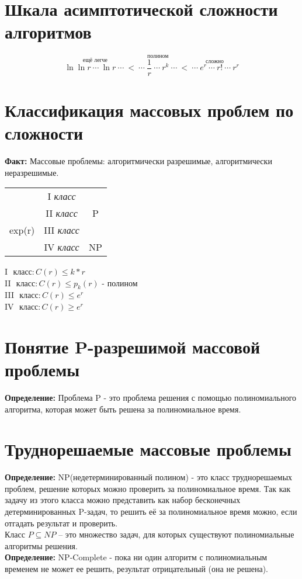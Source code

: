 \documentclass[../main.tex]{subfiles}
\begin{document}
%
\section{Шкала асимптотической сложности алгоритмов}
\[\stackrel{\textit{ещё легче}}{\ln{\ln{r}} \ \cdots \ \ln{r}  \ \cdots \ }  < \stackrel{\textit{полином}}{ \ \cdots \ \frac{1}{r}  \ \cdots \ r^k  \ \cdots \ } < \stackrel{\textit{сложно}}{\ \cdots \  e^r  \ \cdots \ r!  \ \cdots \ r^r}\]

%
\section{Классификация массовых проблем по сложности}
\textbf{Факт:
} Массовые проблемы: алгоритмически разрешимые, алгоритмически неразрешимые. \\
\begin{center}
	\begin{tabular}{c c c}
		&I \textit{ класс}& \\
		&II \textit{ класс}&  P \\
		\hline
		exp(r)&III \textit{ класс}& \\ 
		&IV \textit{ класс}&  NP \\
	\end{tabular}
\end{center}
I $\textit{ класс} : C(r) \leq k*r$ \\
II $\textit{ класс} : C(r) \leq p_k(r)$ - полином \\
III $\textit{ класс}: C(r) \leq e^r$ \\
IV $\textit{ класс} : C(r) \geq e^r$  \\


\section{Понятие P-разрешимой массовой проблемы}
\textbf{Определение:
} Проблема P - это проблема решения с помощью полиномиального алгоритма, которая может быть решена за полиномиальное время. 

\section{Труднорешаемые массовые проблемы}
\textbf{Определение:
} NP(недетерминированный полином) - это класс труднорешаемых проблем, решение которых можно проверить за полиномиальное время. Так как задачу из этого класса можно представить как набор бесконечных детерминированных P-задач, то решить её за полиномиальное время можно, если отгадать результат и проверить. \\
Класс $P \subseteq NP$ – это множество задач, для которых существуют полиномиальные алгоритмы решения. \\
\textbf{Определение:
} NP-Complete - пока ни один алгоритм с полиномиальным временем не может ее решить, результат отрицательный (она не решена).
\end{document}
